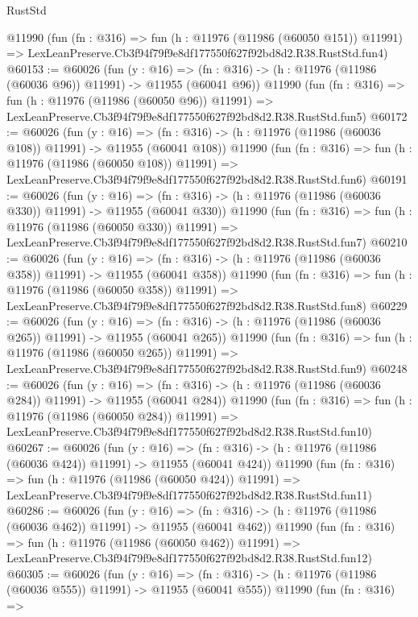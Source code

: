 \begin{lexlean}{RustStd}
\begin{coremodule}
    @11990
    (fun (fn : @316) =>
    fun (h : @11976 (@11986 (@60050 @151)) @11991) =>
    LexLeanPreserve.Cb3f94f79f9e8df177550f627f92bd8d2.R38.RustStd.fun4)
@60153 := @60026
    (fun (y : @16) =>
    (fn : @316) -> (h : @11976 (@11986 (@60036 @96)) @11991) -> @11955 (@60041 @96))
    @11990
    (fun (fn : @316) =>
    fun (h : @11976 (@11986 (@60050 @96)) @11991) =>
    LexLeanPreserve.Cb3f94f79f9e8df177550f627f92bd8d2.R38.RustStd.fun5)
@60172 := @60026
    (fun (y : @16) =>
    (fn : @316) -> (h : @11976 (@11986 (@60036 @108)) @11991) -> @11955 (@60041 @108))
    @11990
    (fun (fn : @316) =>
    fun (h : @11976 (@11986 (@60050 @108)) @11991) =>
    LexLeanPreserve.Cb3f94f79f9e8df177550f627f92bd8d2.R38.RustStd.fun6)
@60191 := @60026
    (fun (y : @16) =>
    (fn : @316) -> (h : @11976 (@11986 (@60036 @330)) @11991) -> @11955 (@60041 @330))
    @11990
    (fun (fn : @316) =>
    fun (h : @11976 (@11986 (@60050 @330)) @11991) =>
    LexLeanPreserve.Cb3f94f79f9e8df177550f627f92bd8d2.R38.RustStd.fun7)
@60210 := @60026
    (fun (y : @16) =>
    (fn : @316) -> (h : @11976 (@11986 (@60036 @358)) @11991) -> @11955 (@60041 @358))
    @11990
    (fun (fn : @316) =>
    fun (h : @11976 (@11986 (@60050 @358)) @11991) =>
    LexLeanPreserve.Cb3f94f79f9e8df177550f627f92bd8d2.R38.RustStd.fun8)
@60229 := @60026
    (fun (y : @16) =>
    (fn : @316) -> (h : @11976 (@11986 (@60036 @265)) @11991) -> @11955 (@60041 @265))
    @11990
    (fun (fn : @316) =>
    fun (h : @11976 (@11986 (@60050 @265)) @11991) =>
    LexLeanPreserve.Cb3f94f79f9e8df177550f627f92bd8d2.R38.RustStd.fun9)
@60248 := @60026
    (fun (y : @16) =>
    (fn : @316) -> (h : @11976 (@11986 (@60036 @284)) @11991) -> @11955 (@60041 @284))
    @11990
    (fun (fn : @316) =>
    fun (h : @11976 (@11986 (@60050 @284)) @11991) =>
    LexLeanPreserve.Cb3f94f79f9e8df177550f627f92bd8d2.R38.RustStd.fun10)
@60267 := @60026
    (fun (y : @16) =>
    (fn : @316) -> (h : @11976 (@11986 (@60036 @424)) @11991) -> @11955 (@60041 @424))
    @11990
    (fun (fn : @316) =>
    fun (h : @11976 (@11986 (@60050 @424)) @11991) =>
    LexLeanPreserve.Cb3f94f79f9e8df177550f627f92bd8d2.R38.RustStd.fun11)
@60286 := @60026
    (fun (y : @16) =>
    (fn : @316) -> (h : @11976 (@11986 (@60036 @462)) @11991) -> @11955 (@60041 @462))
    @11990
    (fun (fn : @316) =>
    fun (h : @11976 (@11986 (@60050 @462)) @11991) =>
    LexLeanPreserve.Cb3f94f79f9e8df177550f627f92bd8d2.R38.RustStd.fun12)
@60305 := @60026
    (fun (y : @16) =>
    (fn : @316) -> (h : @11976 (@11986 (@60036 @555)) @11991) -> @11955 (@60041 @555))
    @11990
    (fun (fn : @316) =>

\end{coremodule}
\end{lexlean}
